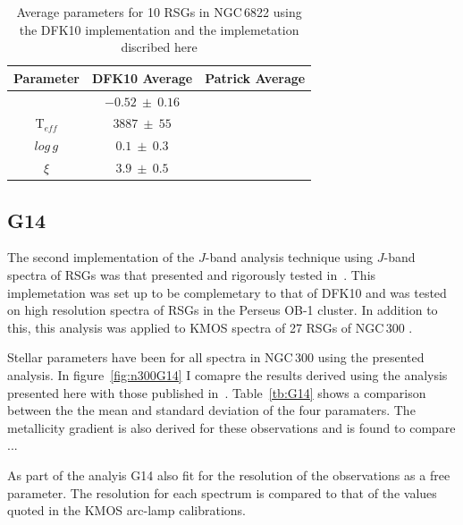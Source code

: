 \documentclass[12pt]{article}
\begin{document}
\begin{table}
\caption[Parameter comparisons DFK10]{Average parameters for 10 RSGs in NGC\,6822 using the DFK10 implementation and the implemetation discribed here\label{tb:DFK10}}
\scriptsize
\begin{center}
\begin{tabular}{ccc}
 \hline
 \hline
Parameter & DFK10 Average & Patrick Average \\
 \hline
[Z]       & $-0.52~\pm~0.16$ &  \\
T$_{eff}$ & $3887~\pm~55$ &  \\
$log\,g$  & $0.1~\pm~0.3$ &  \\
$\xi$     & $3.9~\pm~0.5$ &  \\
 \hline
\end{tabular}
\end{center}
\end{table}

\subsection{G14} %
\label{sub:g14}
The second implementation of the $J$-band analysis technique using $J$-band spectra of RSGs was that presented and rigorously tested in~\cite{2014PhDT.........G}.
This implemetation was set up to be complemetary to that of DFK10 and was tested on high resolution spectra of RSGs in the Perseus OB-1 cluster.
In addition to this, this analysis was applied to KMOS spectra of 27 RSGs of NGC\,300
\citep{...}.

Stellar parameters have been for all spectra in NGC\,300 using the presented analysis.
In figure~\ref{fig:n300G14} I comapre the results derived using the analysis presented here with those published in~\citep{...}.
Table~\ref{tb:G14} shows a comparison between the the mean and standard deviation of the four paramaters.
The metallicity gradient is also derived for these observations and is found to compare ...

As part of the analyis G14 also fit for the resolution of the observations as a free parameter.
The resolution for each spectrum is compared to that of the values quoted in the KMOS arc-lamp calibrations.
\end{document}
